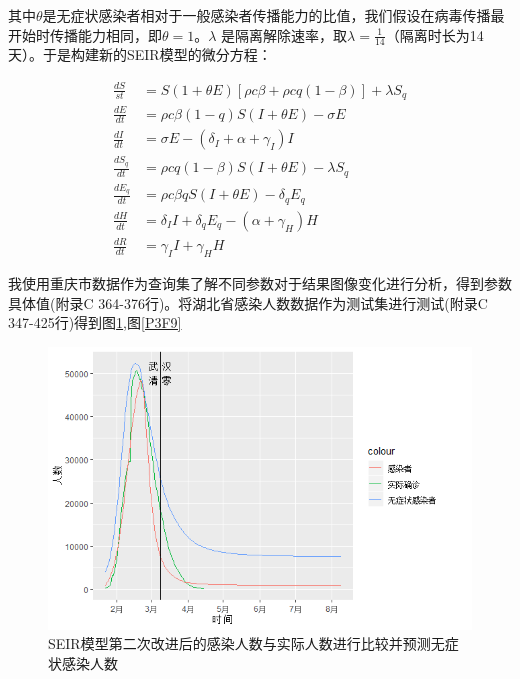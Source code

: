 \documentclass[a4paper, 11pt,twoside=true,UTF8]{scrartcl}
\begin{document}
其中$\theta$是无症状感染者相对于一般感染者传播能力的比值，我们假设在病毒传播最开始时传播能力相同，即$\theta =1$。$\lambda$ 是隔离解除速率，取$\lambda=\frac{1}{14}$（隔离时长为14天）。于是构建新的SEIR模型的微分方程：

$$
\begin{aligned}
\frac{dS}{st}&=S(1+\theta E)\left[ \rho c \beta + \rho cq(1-\beta) \right]+\lambda S_q \\
\frac{dE}{dt}&=\rho c \beta (1-q)S(I+\theta E)-\sigma E \\
\frac{dI}{dt}&=\sigma E-\left( \delta_I +\alpha +\gamma_I \right)I \\
\frac{dS_q}{dt}&=\rho c q(1-\beta)S(I+\theta E)-\lambda S_q \\
\frac{dE_q}{dt}&=\rho c \beta q S(I+\theta E)-\delta_qE_q \\
\frac{dH}{dt}&=\delta_II+\delta_qE_q-\left( \alpha + \gamma_H \right)H \\
\frac{dR}{dt}&=\gamma_II+\gamma_HH
\end{aligned}
$$

我使用重庆市数据作为查询集了解不同参数对于结果图像变化进行分析，得到参数具体值(附录C 364-376行)。将湖北省感染人数数据作为测试集进行测试(附录C 347-425行)得到图\ref{P3F8},图\ref{P3F9}

\begin{figure}[H]
	\small
	\centering
	\includegraphics[width=12.5cm]{P3F8}
	\caption{SEIR模型第二次改进后的感染人数与实际人数进行比较并预测无症状感染人数} \label{P3F8}
\end{figure}
\end{document}
